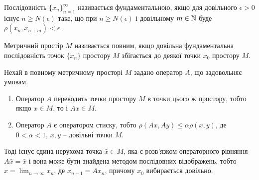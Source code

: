 \begin{definition} 
	Послідовність $\{x_n\}_{n=1}^\infty$ називається фундаментальною, як\-що для довільного $\epsilon > 0$ існує $n \ge N(\epsilon)$ таке, що при $n \ge N(\epsilon)$ і довільному $m\in\mathbb{N}$ буде $\rho(x_n,x_{n+m}) < \epsilon$.
\end{definition}
\begin{definition} 
	Метричний простір $M$ називається повним, якщо довільна фундаментальна послідовність точок $\{x_n\}$ простору $M$ збігається до деякої точки $x_0$ простору $M$.
\end{definition}
\begin{theorem} 
	Нехай в повному метричному просторі $M$ задано оператор $A$, що задовольняє умовам.
	\begin{enumerate}
		\item Оператор $A$ переводить точки простору $M$ в точки цього ж простору, тобто якщо $x\in M$, то і $Ax \in M$.
		\item Оператор $A$ є оператором стиску, тобто $\rho(Ax,Ay)\le\alpha\rho(x,y)$, де $0<\alpha<1$, $x,y$ -- довільні точки $M$. 
	\end{enumerate}
	Тоді існує єдина нерухома точка $\bar x \in M$, яка є розв’язком операторного рівняння $A\bar x=\bar x$ і вона може бути знайдена методом послідовних відображень, тобто $x = \lim_{n\to\infty} x_n$, де $x_{n+1} = A x_n$, причому $x_0$ вибирається довільно.
\end{theorem}

